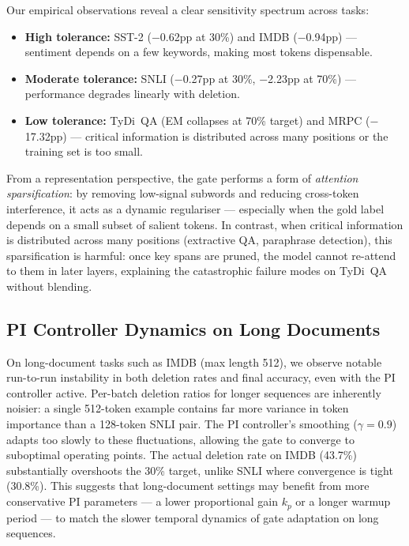 \documentclass[11pt,a4paper]{article}
\begin{document}
Our empirical observations reveal a clear sensitivity spectrum across tasks:

\begin{itemize}[nosep]
    \item \textbf{High tolerance:} SST-2 ($-$0.62pp at 30\%) and IMDB ($-$0.94pp) --- sentiment depends on a few keywords, making most tokens dispensable.
    \item \textbf{Moderate tolerance:} SNLI ($-$0.27pp at 30\%, $-$2.23pp at 70\%) --- performance degrades linearly with deletion.
    \item \textbf{Low tolerance:} TyDi~QA (EM collapses at 70\% target) and MRPC ($-$17.32pp) --- critical information is distributed across many positions or the training set is too small.
\end{itemize}

From a representation perspective, the gate performs a form of \emph{attention sparsification}: by removing low-signal subwords and reducing cross-token interference, it acts as a dynamic regulariser --- especially when the gold label depends on a small subset of salient tokens. In contrast, when critical information is distributed across many positions (extractive QA, paraphrase detection), this sparsification is harmful: once key spans are pruned, the model cannot re-attend to them in later layers, explaining the catastrophic failure modes on TyDi~QA without blending.



\subsection{PI Controller Dynamics on Long Documents}
\label{sec:imdb-instability}

On long-document tasks such as IMDB (max length 512), we observe notable run-to-run instability in both deletion rates and final accuracy, even with the PI controller active. Per-batch deletion ratios for longer sequences are inherently noisier: a single 512-token example contains far more variance in token importance than a 128-token SNLI pair. The PI controller's smoothing ($\gamma=0.9$) adapts too slowly to these fluctuations, allowing the gate to converge to suboptimal operating points. The actual deletion rate on IMDB (43.7\%) substantially overshoots the 30\% target, unlike SNLI where convergence is tight (30.8\%). This suggests that long-document settings may benefit from more conservative PI parameters --- a lower proportional gain $k_p$ or a longer warmup period --- to match the slower temporal dynamics of gate adaptation on long sequences.
\end{document}
